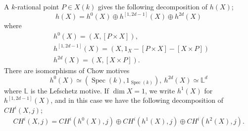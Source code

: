 \documentclass[a4paper,12pt]{amsart}
\numberwithin{equation}{section}
\theoremstyle{definition}
\begin{document}
A $k$-rational point $P\in X(k)$ gives the following decomposition of $h(X)$;
$$
h(X)=h^0(X) \oplus h^{[1,2d-1]}(X) \oplus h^{2d}(X) 
$$
where 
\begin{align*}
&h^0(X)=(X, [P\times X]),\\
&h^{[1,2d-1]}(X)=(X, 1_X-[P\times X]-[X\times P])\\
&h^{2d}(X)=(X, [X\times P]).
\end{align*}
There are isomorphisms of Chow motives
$$
h^0(X)\simeq (\operatorname{Spec}(k), 1_{\operatorname{Spec}(k)}),\ h^{2d}(X)\simeq \mathbb{L}^{d}
$$
where $\mathbb{L}$ is the Lefschetz motive.
If $\dim X=1$, we write $h^1(X)$ for $h^{[1,2d-1]}(X)$, and in this case we have the following decomposition of $CH^i(X,j)$;
\begin{align}
    CH^i(X,j)=CH^i(h^0(X),j)\oplus CH^i(h^1(X),j)\oplus CH^i(h^2(X),j).
\end{align}
\end{document}
